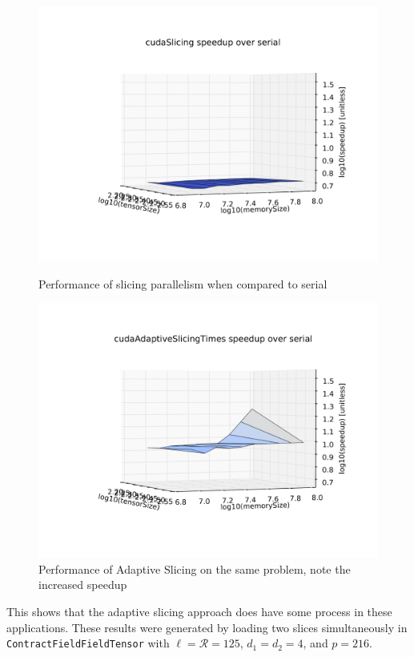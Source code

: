 \begin{figure}[H]
    \centering
    \includegraphics[scale = .12]{CFFTSlicingVSSerial}
    \caption{Performance of slicing parallelism when compared to serial}

    \includegraphics[scale = .12]{CFFTAdaptiveSlicingVSSerial}
    \caption{Performance of Adaptive Slicing on the same problem, note the increased speedup}
\label{fig:TwoSlicings}
\end{figure}

This shows that the adaptive slicing approach does have some process in these applications. These results were generated by loading two slices simultaneously in \texttt{ContractFieldFieldTensor} with $\ell = \mathcal{R} = 125$, $d_1 = d_2 = 4$, and $p=216$.

